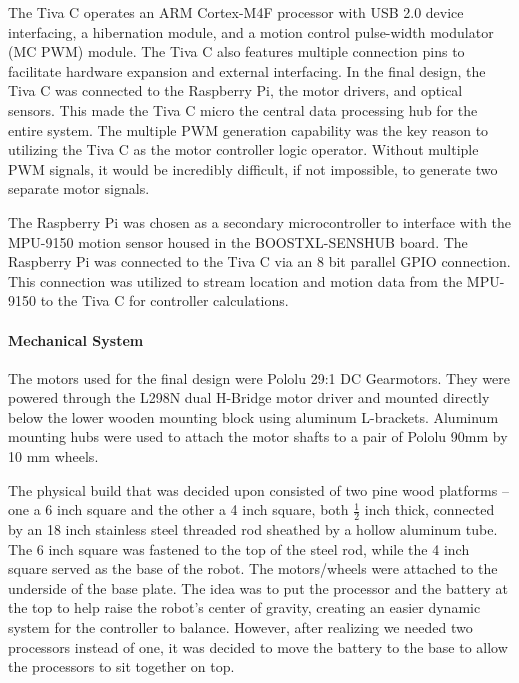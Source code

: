 \documentclass[11pt]{report}
\begin{document}
\begin{spacing}{1.5}
        The Tiva C operates an ARM Cortex-M4F processor with USB 2.0 device interfacing, a hibernation module, and a motion control pulse-width modulator (MC PWM) module.  The Tiva C also features multiple connection pins to facilitate hardware expansion and external interfacing.  In the final design, the Tiva C was connected to the Raspberry Pi, the motor drivers, and optical sensors.  This made the Tiva C micro the central data processing hub for the entire system.  The multiple PWM generation capability was the key reason to utilizing the Tiva C as the motor controller logic operator.  Without multiple PWM signals, it would be incredibly difficult, if not impossible, to generate two separate motor signals.

        The Raspberry Pi was chosen as a secondary microcontroller to interface with the MPU-9150 motion sensor housed in the BOOSTXL-SENSHUB board.  The Raspberry Pi was connected to the Tiva C via an 8 bit parallel GPIO connection.  This connection was utilized to stream location and motion data from the MPU-9150 to the Tiva C for controller calculations.

        \paragraph{Mechanical System}
        
        The motors used for the final design were Pololu 29:1 DC Gearmotors.  They were powered through the L298N dual H-Bridge motor driver and mounted directly below the lower wooden mounting block using aluminum L-brackets. Aluminum mounting hubs were used to attach the motor shafts to a pair of Pololu 90mm by 10 mm wheels. 
        
        The physical build that was decided upon consisted of two pine wood platforms – one a 6 inch square and the other a 4 inch square, both $\frac{1}{2}$ inch thick, connected by an 18 inch stainless steel threaded rod sheathed by a hollow aluminum tube. The 6 inch square was fastened to the top of the steel rod, while the 4 inch square served as the base of the robot. The motors/wheels were attached to the underside of the base plate. The idea was to put the processor and the battery at the top to help raise the robot’s center of gravity, creating an easier dynamic system for the controller to balance. However, after realizing we needed two processors instead of one, it was decided to move the battery to the base to allow the processors to sit together on top. 
        

\end{spacing}
\end{document}
